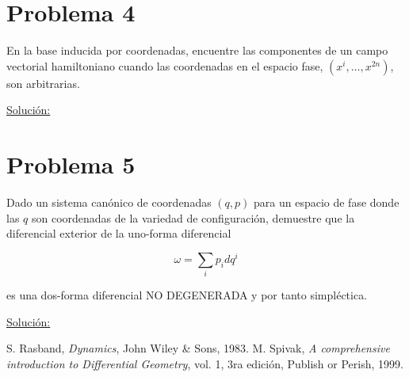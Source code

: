 \documentclass[a4paper,10pt]{article}
\numberwithin{equation}{section}
\begin{document}
\section{Problema 4}

En la base inducida por coordenadas, encuentre las componentes de un campo vectorial 
hamiltoniano cuando las coordenadas en el espacio fase, $(x^i,\dots,x^{2n})$, son 
arbitrarias.

\vspace{.3cm}

\underline{Solución:} \vspace{.3cm}

\section{Problema 5}

Dado un sistema canónico de coordenadas $(q,p)$ para un espacio de fase donde las $q$ 
son coordenadas de la variedad de configuración, demuestre que la diferencial exterior 
de la uno-forma diferencial 

$$
\omega = \sum_i p_idq^i
$$

es una dos-forma diferencial NO DEGENERADA y por tanto simpléctica.

\vspace{.3cm}

\underline{Solución:} \vspace{.3cm}

\begin{thebibliography}{10}
S. Rasband, \emph{Dynamics}, John Wiley \& Sons, 1983.
M. Spivak, \emph{A comprehensive introduction to Differential Geometry}, vol. 1, 
3ra edición, Publish or Perish, 1999.
\end{thebibliography}
\end{document}
